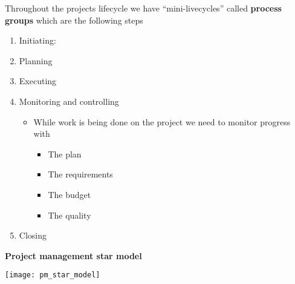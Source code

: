 \documentclass[12pt]{report}
\begin{document}
Throughout the projects lifecycle we have ``mini-livecycles'' called \textbf{process groups} which are the following steps
\begin{enumerate}
  \item Initiating:
  \item Planning
  \item Executing
  \item Monitoring and controlling
        \begin{itemize}
          \item While work is being done on the project we need to monitor progress with
                \begin{itemize}
                  \item The plan
                  \item The requirements
                  \item The budget
                  \item The quality
                \end{itemize}
        \end{itemize}
  \item Closing

\end{enumerate}
\textbf{Project management star model}

\texttt{[image: pm\_star\_model]}
\end{document}
